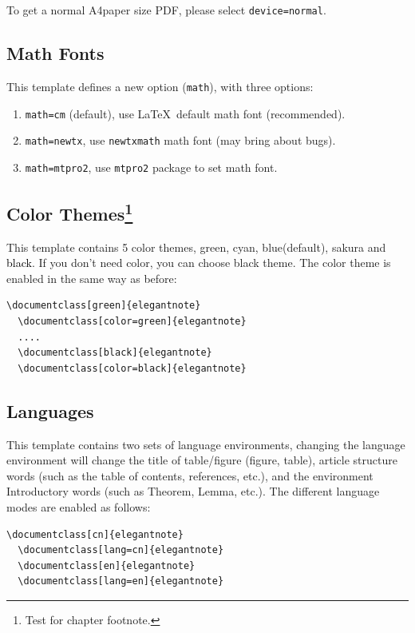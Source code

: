 \documentclass[en,hazy,blue,screen,14pt]{elegantnote}
\begin{document}
\begin{note}
To get a normal A4paper size PDF, please select \lstinline{device=normal}.
\end{note}

\subsection{Math Fonts}

This template defines a new option (\lstinline{math}), with three options:

\begin{enumerate}
  \item \lstinline{math=cm} (default), use \LaTeX\ default math font (recommended).
  \item \lstinline{math=newtx}, use \lstinline{newtxmath} math font (may bring about bugs).
  \item \lstinline{math=mtpro2}, use \lstinline{mtpro2} package to set math font.
\end{enumerate}


\subsection[Color Themes]{Color Themes\footnote{Test for chapter footnote.}}

This template contains 5 color themes, \textcolor{egreen}{green}, \textcolor{ecyan}{cyan}, \textcolor{eblue}{blue}(default), \textcolor{sakura}{sakura} and \textcolor{black}{black}. If you don't need color, you can choose black theme. The color theme is enabled in the same way as before:
\begin{lstlisting}[frame=none]  
  \documentclass[green]{elegantnote}
  \documentclass[color=green]{elegantnote}
  ....
  \documentclass[black]{elegantnote}
  \documentclass[color=black]{elegantnote}
\end{lstlisting}


\subsection{Languages}

This template contains two sets of language environments, changing the language environment will change the title of table/figure (figure, table), article structure words (such as the table of contents, references, etc.), and the environment Introductory words (such as Theorem, Lemma, etc.). The different language modes are enabled as follows:
\begin{lstlisting}[frame=none]  
  \documentclass[cn]{elegantnote}
  \documentclass[lang=cn]{elegantnote}
  \documentclass[en]{elegantnote}
  \documentclass[lang=en]{elegantnote}
\end{lstlisting}
\end{document}

